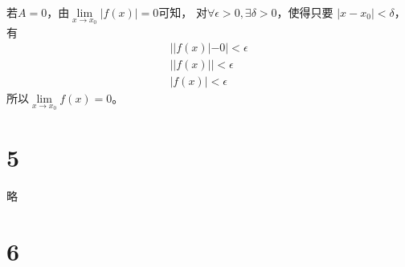\documentclass{article}
\begin{document}
若$A = 0$，由$\lim\limits_{x \to x_0} |f(x)| = 0$可知，
对$\forall \epsilon > 0, \exists \delta > 0$，使得只要
$|x - x_0| < \delta$，有
\begin{align*}
  ||f(x)| - 0| < \epsilon \\
  ||f(x)|| < \epsilon     \\
  |f(x)| < \epsilon
\end{align*}
所以$\lim\limits_{x \to x_0} f(x) = 0$。

\section*{5}

略

\section*{6}
\end{document}
